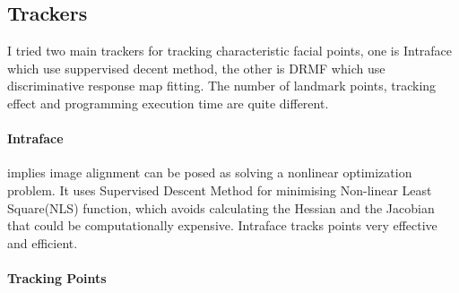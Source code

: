\subsection{Trackers}
I tried two main trackers for tracking characteristic facial points, one is Intraface \cite{xiong2013supervised} which use suppervised decent method, the other is DRMF \cite{asthana2013robust} which use discriminative response map fitting. The number of landmark points, tracking effect and programming execution time are quite different.
\paragraph{Intraface}
\cite{xiong2013supervised} implies image alignment  can be posed as solving a nonlinear optimization problem. It uses Supervised Descent Method for minimising Non-linear Least Square(NLS) function, which avoids calculating the Hessian and the Jacobian that could be computationally expensive. Intraface tracks points very effective and efficient.
\newline
\paragraph{Tracking Points}
